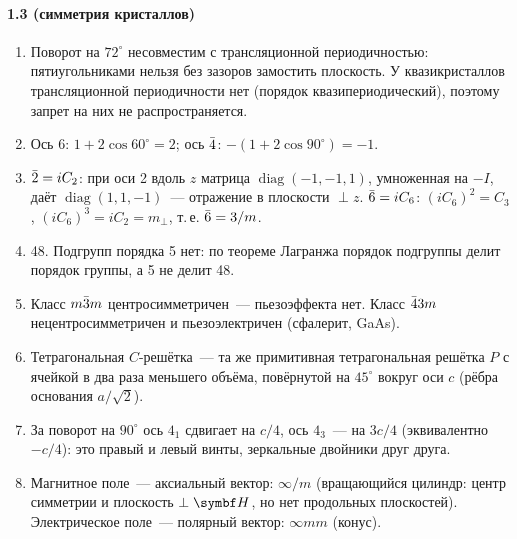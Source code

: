 {\paragraph{1.3 (симметрия кристаллов)}
\begin{enumerate}[label=\arabic*.]
\item Поворот на $72^\circ$ несовместим с трансляционной периодичностью:
пятиугольниками нельзя без зазоров замостить плоскость. У квазикристаллов
трансляционной периодичности нет (порядок квазипериодический), поэтому
запрет на них не распространяется.
\item Ось 6: $1+2\cos60^\circ=2$; ось $\bar{4}$: $-(1+2\cos90^\circ)=-1$.
\item $\bar{2}=iC_2$: при оси 2 вдоль $z$ матрица $\operatorname{diag}(-1,-1,1)$,
умноженная на $-I$, даёт $\operatorname{diag}(1,1,-1)$~— отражение в
плоскости $\perp z$. $\bar{6}=iC_6$: $(iC_6)^2=C_3$, $(iC_6)^3=iC_2=m_\perp$,
т.\,е. $\bar{6}=3/m$.
\item 48. Подгрупп порядка 5 нет: по теореме Лагранжа порядок подгруппы
делит порядок группы, а 5 не делит 48.
\item Класс $m\bar{3}m$ центросимметричен~— пьезоэффекта нет. Класс $\bar{4}3m$
нецентросимметричен и пьезоэлектричен (сфалерит, GaAs).
\item Тетрагональная $C$-решётка~— та же примитивная тетрагональная
решётка $P$ с ячейкой в два раза меньшего объёма, повёрнутой на $45^\circ$
вокруг оси $c$ (рёбра основания $a/\sqrt2$).
\item За поворот на $90^\circ$ ось $4_1$ сдвигает на $c/4$, ось $4_3$~— на
$3c/4$ (эквивалентно $-c/4$): это правый и левый винты, зеркальные
двойники друг друга.
\item Магнитное поле~— аксиальный вектор: $\infty/m$ (вращающийся цилиндр:
центр симметрии и плоскость $\perp\vb H$, но нет продольных плоскостей).
Электрическое поле~— полярный вектор: $\infty mm$ (конус).
\end{enumerate}

}

